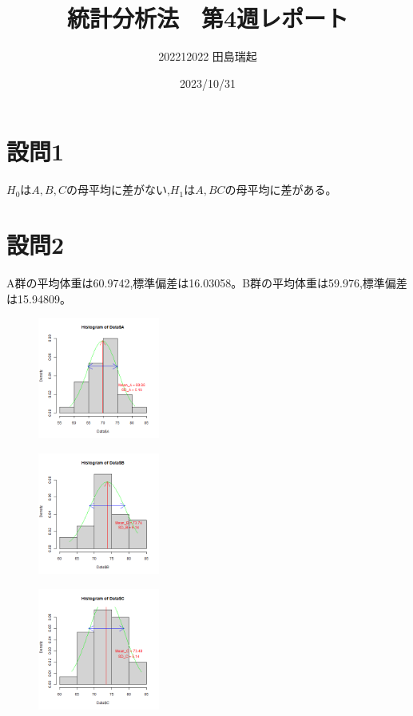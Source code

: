 \documentclass[fontsize = 10pt, paper= a4,twocolumn,column_gap=5zw]{jlreq}
\begin{document}
\title{統計分析法　第4週レポート}
\author{202212022 田島瑞起}
\date{2023/10/31}
\maketitle
\section{設問1}
${H_0}$は$A,B,C$の母平均に差がない,${H_1}$は$A,BC$の母平均に差がある。
\section{設問2}
A群の平均体重は60.9742,標準偏差は16.03058。B群の平均体重は59.976,標準偏差は15.94809。
\begin{figure}
    \centering
    \includegraphics[width=4cm]{4-2-1.png}
\end{figure}

\begin{figure}
    \centering
    \includegraphics[width=4cm]{4-2-2.png}
\end{figure}

\begin{figure}
    \centering
    \includegraphics[width=4cm]{4-2-3.png}
\end{figure}
\end{document}
